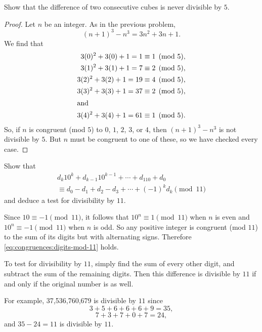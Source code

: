  Show that the difference of two consecutive cubes is
never divisible by $5$.
\begin{proof}
  Let $n$ be an integer. As in the previous problem,
  \begin{equation*}
    (n+1)^3 - n^3 = 3n^2 + 3n + 1.
  \end{equation*}
  We find that
  \begin{align*}
    3(0)^2 + 3(0) + 1 = 1 &\equiv1\pmod5, \\
    3(1)^2 + 3(1) + 1 = 7 &\equiv2\pmod5, \\
    3(2)^2 + 3(2) + 1 = 19 &\equiv4\pmod5, \\
    3(3)^2 + 3(3) + 1 = 37 &\equiv2\pmod5, \\
    \intertext{and}
    3(4)^2 + 3(4) + 1 = 61 &\equiv1\pmod5.
  \end{align*}
  So, if $n$ is congruent (mod $5$) to $0$, $1$, $2$, $3$, or $4$,
  then $(n+1)^3-n^3$ is not divisible by $5$. But $n$ must be
  congruent to one of these, so we have checked every case.
\end{proof}

 Show that
\begin{multline}
  \label{eq:congruences:digits-mod-11}
  d_k10^k + d_{k-1}10^{k-1} + \cdots + d_110 + d_0 \\
  \equiv d_0 - d_1 + d_2 - d_3 + \cdots + (-1)^kd_k\pmod{11}
\end{multline}
and deduce a test for divisibility by $11$.
\begin{solution}
  Since $10\equiv-1\pmod{11}$, it follows that $10^n\equiv1\pmod{11}$
  when $n$ is even and $10^n\equiv-1\pmod{11}$ when $n$ is odd. So any
  positive integer is congruent (mod $11$) to the sum of its digits
  but with alternating signs. Therefore
  \eqref{eq:congruences:digits-mod-11} holds.

  To test for divisibility by $11$, simply find the sum of every other
  digit, and subtract the sum of the remaining digits. Then this
  difference is divisible by $11$ if and only if the original number
  is as well.

  For example, 37,536,760,679 is divisible by $11$ since
  \begin{equation*}
    3 + 5 + 6 + 6 + 6 + 9 = 35,
  \end{equation*}
  \begin{equation*}
    7 + 3 + 7 + 0 + 7 = 24,
  \end{equation*}
  and $35 - 24 = 11$ is divisible by $11$.
\end{solution}

